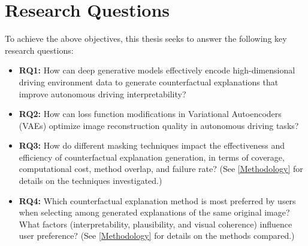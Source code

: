 \section{Research Questions} \label{sec:research_question}
To achieve the above objectives, this thesis seeks to answer the following key research questions:

\begin{itemize}
    \item \textbf{RQ1:} How can deep generative models effectively encode high-dimensional driving environment data to generate counterfactual explanations that improve autonomous driving interpretability?

    \item \textbf{RQ2:} How can loss function modifications in Variational Autoencoders (VAEs) optimize image reconstruction quality in autonomous driving tasks? 
    
    \item \textbf{RQ3:} How do different masking techniques impact the effectiveness and efficiency of counterfactual explanation generation, in terms of coverage, computational cost, method overlap, and failure rate?  (See \cref{Methodology} for details on the techniques investigated.) 

    \item \textbf{RQ4:} Which counterfactual explanation method is most preferred by users when selecting among generated explanations of the same original image? What factors (interpretability, plausibility, and visual coherence) influence user preference? (See \cref{Methodology} for details on the methods compared.)


\end{itemize}

